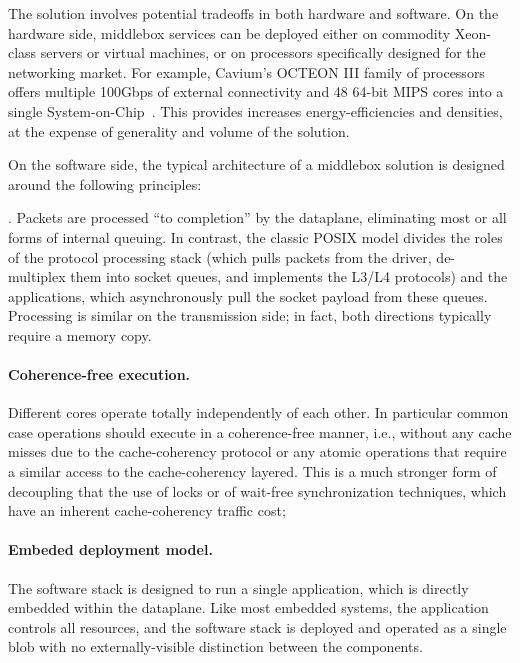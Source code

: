 The solution involves potential tradeoffs in both hardware and
software.  On the hardware side, middlebox services can be deployed
either on commodity Xeon-class servers or virtual machines, or on
processors specifically designed for the networking market.  For
example, Cavium's OCTEON III family of processors offers multiple
100Gbps of external connectivity and 48 64-bit MIPS cores into a
single System-on-Chip~\cite{cavium-octeon}.  This provides increases
energy-efficiencies and densities, at the expense of generality and
volume of the solution.  

On the software side, the typical architecture of a middlebox solution
is designed around the following principles: 

.  Packets are processed ``to
completion'' by the dataplane, eliminating most or all forms of
internal queuing.  In contrast, the classic POSIX model divides the
roles of the protocol processing stack (which pulls packets from the
driver, de-multiplex them into socket queues, and implements the L3/L4
protocols) and the applications, which asynchronously pull the socket
payload from these queues.  Processing is similar on the transmission
side; in fact, both directions typically require a memory copy. 

\paragraph{Coherence-free execution.} 
Different cores operate totally independently
of each other.  In particular common case operations should execute in
a coherence-free manner, i.e., without any cache misses due to the
cache-coherency protocol or any atomic operations that require a
similar access to the cache-coherency layered. This is a much stronger
form of decoupling that the use of locks or of wait-free
synchronization techniques, which have an inherent cache-coherency
traffic cost; 

\paragraph{Embeded deployment model.} 

The software stack is designed to run a single
application, which is directly embedded within the dataplane.  Like
most embedded systems, the application controls all resources, and the
software stack is deployed and operated as a single blob with no
externally-visible distinction between the components.








